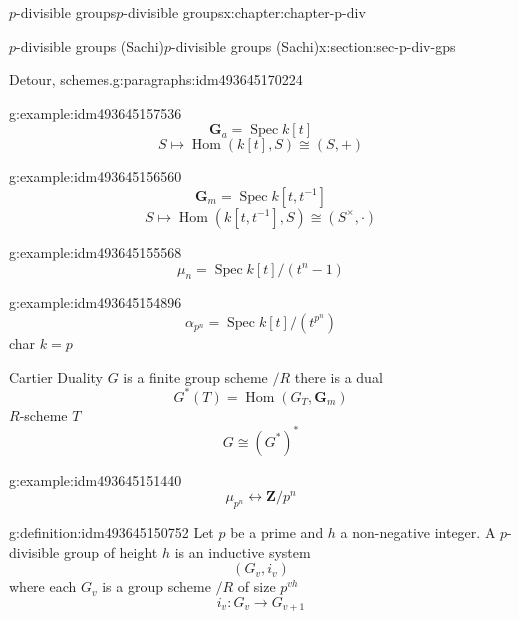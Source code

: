 \documentclass[oneside,10pt,]{book}
\numberwithin{equation}{section}
\newcommand{\inv}{^{-1}}
\newcommand{\ZZ}{\mathbf{Z}}
\DeclareMathOperator{\Hom}{Hom}
\DeclareMathOperator{\Spec}{Spec}
\begin{document}
\begin{chapterptx}{\(p\)-divisible groups}{}{\(p\)-divisible groups}{}{}{x:chapter:chapter-p-div}
\begin{sectionptx}{\(p\)-divisible groups (Sachi)}{}{\(p\)-divisible groups (Sachi)}{}{}{x:section:sec-p-div-gps}
\begin{paragraphs}{Detour, schemes.}{g:paragraphs:idm493645170224}
\begin{example}{}{g:example:idm493645157536}
%
\begin{equation*}
\mathbf G_a = \Spec k[t]
\end{equation*}
%
\begin{equation*}
S\mapsto \Hom(k[t], S) \cong (S,+)
\end{equation*}
%
\end{example}
\begin{example}{}{g:example:idm493645156560}%
%
\begin{equation*}
\mathbf G_m = \Spec k[t,t\inv]
\end{equation*}
%
\begin{equation*}
S\mapsto \Hom(k[t,t\inv], S) \cong (S^\times,\cdot)
\end{equation*}
%
\end{example}
\begin{example}{}{g:example:idm493645155568}%
%
\begin{equation*}
\mu_n = \Spec k[t]/(t^n -1)
\end{equation*}
%
\end{example}
\begin{example}{}{g:example:idm493645154896}%
%
\begin{equation*}
\alpha_{p^n} = \Spec k[t]/(t^{p^n})
\end{equation*}
char \(k = p\)%
\end{example}
Cartier Duality \(G\) is a finite group scheme \(/R\) there is a dual%
\begin{equation*}
G^* (T) = \Hom (G_T, \mathbf G_m)
\end{equation*}
\(R\)-scheme \(T\)%
\begin{equation*}
G \cong (G^*)^*
\end{equation*}
%
\begin{example}{}{g:example:idm493645151440}%
%
\begin{equation*}
\mu_{p^n} \leftrightarrow \ZZ/p^n
\end{equation*}
%
\end{example}
\begin{definition}{}{g:definition:idm493645150752}%
Let \(p\) be a prime and \(h\) a non-negative integer. A \(p\)-divisible group of height \(h\) is an inductive system%
\begin{equation*}
(G_v, i_v)
\end{equation*}
where each \(G_v\) is a group scheme \(/R\) of size \(p^{vh}\)%
\begin{equation*}
i_v \colon G_v \to G_{v+1}
\end{equation*}

\end{definition}
\end{paragraphs}
\end{sectionptx}
\end{chapterptx}
\end{document}
